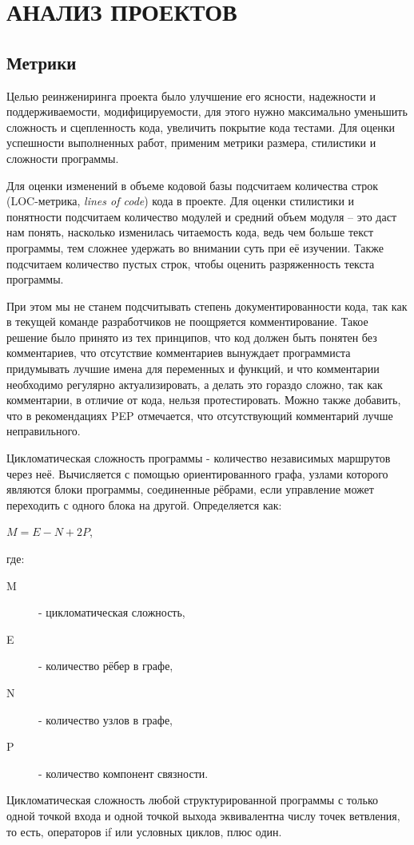\section{АНАЛИЗ ПРОЕКТОВ}
    \subsection{Метрики}
    Целью реинжениринга проекта было улучшение его ясности, надежности и поддерживаемости,
    модифицируемости, для этого нужно максимально уменьшить сложность и сцепленность кода,
    увеличить покрытие кода тестами.
    Для оценки успешности выполненных работ, применим метрики размера,
    стилистики и сложности программы.
    \cite{clearcode.habr}

    Для оценки изменений в объеме кодовой базы подсчитаем количества строк
    (LOC-метрика, \textit{lines of code}) кода в проекте.
    Для оценки стилистики и понятности подсчитаем количество модулей и средний
    объем модуля -- это даст нам понять, насколько изменилась читаемость кода,
    ведь чем больше текст программы, тем сложнее удержать во внимании суть при 
    её изучении. Также подсчитаем количество пустых строк, чтобы оценить
    разряженность текста программы.

    При этом мы не станем подсчитывать степень документированности кода,
    так как в текущей команде разработчиков не поощряется комментирование.
    Такое решение было принято из тех принципов, что код должен быть понятен без
    комментариев, что отсутствие комментариев вынуждает программиста придумывать
    лучшие имена для переменных и функций,
    и что комментарии необходимо регулярно актуализировать, а делать это
    гораздо сложно, так как комментарии, в отличие от кода, нельзя
    протестировать.
    Можно также добавить, что в рекомендациях PEP отмечается, что отсутствующий
    комментарий лучше неправильного.

    Цикломатическая сложность программы - количество независимых маршрутов через
    неё. Вычисляется с помощью ориентированного графа, узлами которого являются
    блоки программы, соединенные рёбрами, если управление может переходить с
    одного блока на другой. Определяется как:
    \newpage

    \begin{center}
        $ M = E - N + 2P $, 
    \end{center}
    где:
    \begin{description}
        \item [M] - цикломатическая сложность,
        \item [E] - количество рёбер в графе,
        \item [N] - количество узлов в графе,
        \item [P] - количество компонент связности.
    \end{description}
    Цикломатическая сложность любой структурированной программы с только одной
    точкой входа и одной точкой выхода эквивалентна числу точек ветвления,
    то есть, операторов if или условных циклов, плюс один.\cite{complexity.McCabe}

